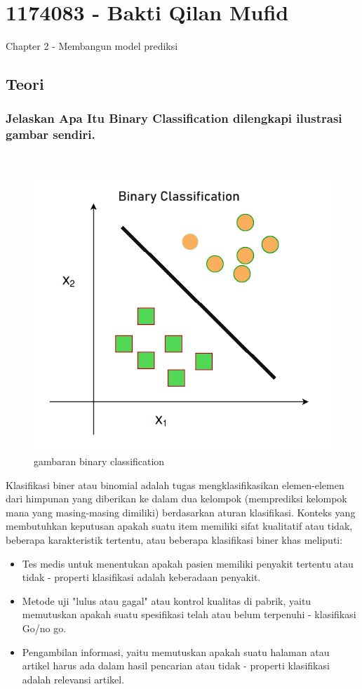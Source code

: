 \section{1174083 - Bakti Qilan Mufid}
Chapter 2 - Membangun model prediksi
\subsection{Teori}
\subsubsection{Jelaskan Apa Itu Binary Classification dilengkapi ilustrasi gambar sendiri.}
\hfill\\
\begin{figure}[H]
    \includegraphics[width=12cm]{figures/1174083/figures2/1.png}
    \centering
    \caption{gambaran binary classification}
\end{figure}

Klasifikasi biner atau binomial adalah tugas mengklasifikasikan elemen-elemen dari himpunan yang diberikan ke dalam dua kelompok (memprediksi kelompok mana yang masing-masing dimiliki) berdasarkan aturan klasifikasi. Konteks yang membutuhkan keputusan apakah suatu item memiliki sifat kualitatif atau tidak, beberapa karakteristik tertentu, atau beberapa klasifikasi biner khas meliputi:
\begin{itemize}
	\item Tes medis untuk menentukan apakah pasien memiliki penyakit tertentu atau tidak - properti klasifikasi adalah keberadaan penyakit.
	\item Metode uji "lulus atau gagal" atau kontrol kualitas di pabrik, yaitu memutuskan apakah suatu spesifikasi telah atau belum terpenuhi - klasifikasi Go/no go.
	\item Pengambilan informasi, yaitu memutuskan apakah suatu halaman atau artikel harus ada dalam hasil pencarian atau tidak - properti klasifikasi adalah relevansi artikel.
\end{itemize}

